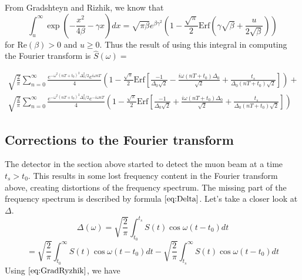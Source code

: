 From Gradshteyn and Rizhik, we know that 
\begin{equation}
\int^{\infty}_u\exp\left(-\frac{x^2}{4\beta}-\gamma x\right)dx=\sqrt{\pi\beta}e^{\beta\gamma^2}\left(1-\frac{\sqrt{\pi}}{2}\text{Erf}\left(\gamma\sqrt{\beta}+\frac{u}{2\sqrt{\beta}}\right)\right)
\label{eq:GradRyzhik}
\end{equation}
for $\text{Re}(\beta)>0$ and $u\geq0$. Thus the result of using this integral in computing the Fourier transform is $\hat{S}(\omega)=$ 

\begin{gather}
\sqrt{\frac{2}{\pi}}\sum^{\infty}_{n=0}\frac{e^{-\omega^2(nT+t_0)^2\Delta^2_0/2}e^{i\omega nT}}{4}\left(1-\frac{\sqrt{\pi}}{2}\text{Erf}\left[\frac{-1}{\Delta_0\sqrt{2}}-\frac{i\omega (nT+t_0)\Delta_0}{\sqrt{2}}+\frac{t_s}{\Delta_0(nT+t_0)\sqrt{2}}\right]\right)+ \nonumber \\
\sqrt{\frac{2}{\pi}}\sum^{\infty}_{n=0}\frac{e^{-\omega^2(nT+t_0)^2\Delta^2_0/2}e^{-i\omega nT}}{4}\left(1-\frac{\sqrt{\pi}}{2}\text{Erf}\left[\frac{-1}{\Delta_0\sqrt{2}}+\frac{i\omega (nT+t_0)\Delta_0}{\sqrt{2}}+\frac{t_s}{\Delta_0(nT+t_0)\sqrt{2}}\right]\right)
\end{gather}

\subsection{Corrections to the Fourier transform} The detector in the section above started to detect the muon beam at a time $t_s>t_0$. This results in some lost frequency content in the Fourier transform above, creating distortions of the frequency spectrum. The missing part of the frequency spectrum is described by formula$~\eqref{eq:Delta}$. Let's take a closer look at $\Delta$. \[\Delta(\omega)=\sqrt{\frac{2}{\pi}}\int^{t_s}_{t_0}S(t)\cos\omega(t-t_0)dt\]\[=\sqrt{\frac{2}{\pi}}\int^{\infty}_{t_0}S(t)\cos\omega(t-t_0)dt-\sqrt{\frac{2}{\pi}}\int^{\infty}_{t_s}S(t)\cos\omega(t-t_0)dt\] Using$~\eqref{eq:GradRyzhik}$, we have 

